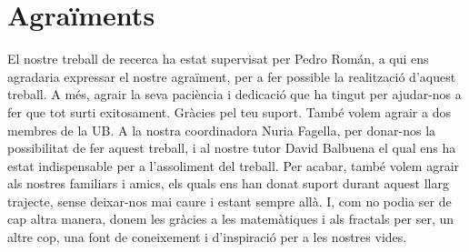 \documentclass[12pt]{report}
\begin{document}
\section{Agraïments}
El nostre treball de recerca ha estat supervisat per Pedro Román, a qui ens agradaria expressar el nostre agraïment, per a fer possible la realització d'aquest treball. A més, agrair la seva paciència i dedicació que ha tingut per ajudar-nos a fer que tot surti exitosament. Gràcies pel teu suport.
\newline
També volem agrair a dos membres de la UB. A la nostra coordinadora Nuria Fagella, per donar-nos la possibilitat de fer aquest treball, i al nostre tutor David Balbuena el qual ens ha estat indispensable per a l'assoliment del treball.
\newline
Per acabar, també volem agrair als nostres familiars i amics, els quals ens han donat suport durant aquest llarg trajecte, sense deixar-nos mai caure i estant sempre allà.
\newline
I, com no podia ser de cap altra manera, donem les gràcies a les matemàtiques i als fractals per ser, un altre cop, una font de coneixement i d'inspiració per a les nostres vides.
\end{document}

